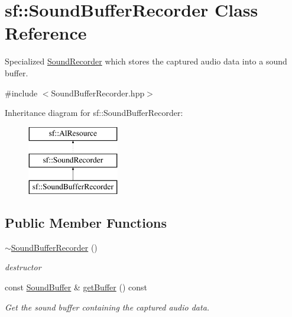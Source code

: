 \hypertarget{classsf_1_1_sound_buffer_recorder}{}\section{sf\+:\+:Sound\+Buffer\+Recorder Class Reference}
\label{classsf_1_1_sound_buffer_recorder}


Specialized \mbox{\hyperlink{classsf_1_1_sound_recorder}{Sound\+Recorder}} which stores the captured audio data into a sound buffer.  




{\ttfamily \#include $<$Sound\+Buffer\+Recorder.\+hpp$>$}

Inheritance diagram for sf\+:\+:Sound\+Buffer\+Recorder\+:\begin{figure}[H]
\begin{center}
\leavevmode
\includegraphics[height=3.000000cm]{classsf_1_1_sound_buffer_recorder}
\end{center}
\end{figure}
\subsection*{Public Member Functions}
\begin{DoxyCompactItemize}
\item 
\mbox{\hyperlink{classsf_1_1_sound_buffer_recorder_a350f7f885ccfd12b4c6c120c23695637}{$\sim$\+Sound\+Buffer\+Recorder}} ()
\begin{DoxyCompactList}\small\item\em destructor \end{DoxyCompactList}\item 
const \mbox{\hyperlink{classsf_1_1_sound_buffer}{Sound\+Buffer}} \& \mbox{\hyperlink{classsf_1_1_sound_buffer_recorder_aa3a8d7a612cb885ed2f58bb86aa24acb}{get\+Buffer}} () const
\begin{DoxyCompactList}\small\item\em Get the sound buffer containing the captured audio data. \end{DoxyCompactList}\end{DoxyCompactItemize}
